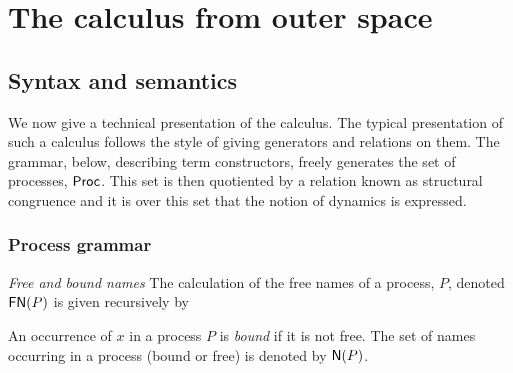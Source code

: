 \section{The calculus from outer space}
\subsection{Syntax and semantics}\label{sub:the_syntax_and_semantics_of_the_notation_system} %

We now give a technical presentation of the calculus. The typical
presentation of such a calculus follows the style of giving generators
and relations on them. The grammar, below, describing term
constructors, freely generates the set of processes, $\mathsf{Proc}$. This set
is then quotiented by a relation known as structural congruence and it
is over this set that the notion of dynamics is expressed.

\subsubsection{Process grammar}\label{subsub:process_grammar}


\begin{definition}
  \emph{Free and bound names} The calculation of the free names of a
  process, $P$, denoted $\mathsf{FN}(P)$ is given recursively by
  
  
  An occurrence of $x$ in a process $P$ is \textit{bound} if it is not
  free. The set of names occurring in a process (bound or free) is
  denoted by $\mathsf{N}(P)$.
\end{definition}

